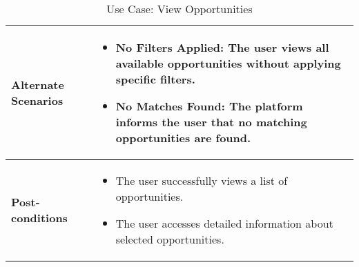 \begin{table}[!ht]
\begin{tabularx}{\textwidth}{|l|X|}
        \hline
        \textbf{Alternate Scenarios} & 
        \begin{itemize}[label=--,itemsep=0pt]
            \item No Filters Applied: The user views all available opportunities without applying specific filters.
            \item No Matches Found: The platform informs the user that no matching opportunities are found.
        \end{itemize} \\
        \hline
        \textbf{Post-conditions} & 
        \begin{itemize}[label=--,itemsep=0pt]
            \item The user successfully views a list of opportunities.
            \item The user accesses detailed information about selected opportunities.
        \end{itemize} \\
        \hline
    \end{tabularx}
    \caption{Use Case: View Opportunities}
    \label{tab:use-case-register}
\end{table}


